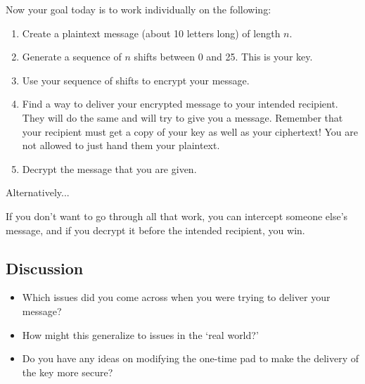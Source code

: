 \documentclass[12pt]{amsart}
\theoremstyle{plain}
\theoremstyle{definition}
\theoremstyle{remark}
\begin{document}
\newpage Now your goal today is to work individually on the following:
\begin{enumerate}[1.]
	\item Create a plaintext message (about 10 letters long) of length $n$.
	\item Generate a sequence of $n$ shifts between 0 and 25.  This is your key.
	\item Use your sequence of shifts to encrypt your message.
	\item Find a way to deliver your encrypted message to your intended recipient.  They will do the same and will try to give you a message.  Remember that your recipient must get a copy of your key as well as your ciphertext!  You are not allowed to just hand them your plaintext.
	\item Decrypt the message that you are given.
\end{enumerate}

\begin{center}
Alternatively...
\end{center}

\noindent If you don't want to go through all that work, you can intercept someone else's message, and if you decrypt it before the intended recipient, you win.

\subsection*{Discussion}
\begin{itemize}
	\item Which issues did you come across when you were trying to deliver your message?\\
	\item How might this generalize to issues in the `real world?'\\
	\item Do you have any ideas on modifying the one-time pad to make the delivery of the key more secure?\\
\end{itemize}
\end{document}
